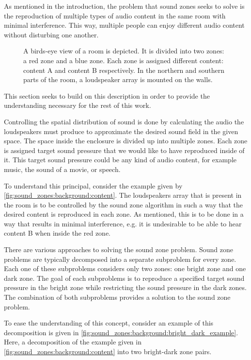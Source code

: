 As mentioned in the introduction, the problem that sound zones seeks to solve is the reproduction
of multiple types of audio content in the same room with minimal interference.
This way, multiple people can enjoy different audio content without disturbing one another.

\begin{figure}[h]
    \centering
    \scalebox{1.0}{}
    \caption{
            A birds-eye view of a room is depicted.
            It is divided into two zones: a red zone and a blue zone.
            Each zone is assigned different content: content A and content B respectively.
            In the northern and southern parts of the room, a loudspeaker array is mounted on the walls.
        }
    \label{fig:sound_zones:background:content}
\end{figure}

This section seeks to build on this description in order to provide the understanding necessary 
for the rest of this work.

Controlling the spatial distribution of sound is done by calculating the audio the loudspeakers must produce to approximate 
the desired sound field in the given space.
The space inside the enclosure is divided up into multiple zones.
Each zone is assigned target sound pressure that we would like to have reproduced inside of it.
This target sound pressure could be any kind of audio content, for example music, the sound of a movie, or speech.

To understand this principal, consider the example given by \autoref{fig:sound_zones:background:content}.
The loudspeakers array that is present in the room is to be controlled by the sound zone algorithm 
in such a way that the desired content is reproduced in each zone.
As mentioned, this is to be done in a way that results in minimal interference, e.g. it is undesirable
to be able to hear content B when inside the red zone.


There are various approaches to solving the sound zone problem.
Sound zone problems are typically decomposed into a separate subproblem for every zone.
Each one of these subproblems considers only two zones: one bright zone and one dark zone.
The goal of each subproblems is to reproduce a specified target sound pressure in the bright zone while restricting the 
sound pressure in the dark zones.
The combination of both subproblems provides a solution to the sound zone problem. 

To ease the understanding of this concept, consider an example of this decomposition is given in 
\autoref{fig:sound_zones:background:bright_dark_example}.
Here, a decomposition of the example given in \autoref{fig:sound_zones:background:content} into 
two bright-dark zone pairs.

